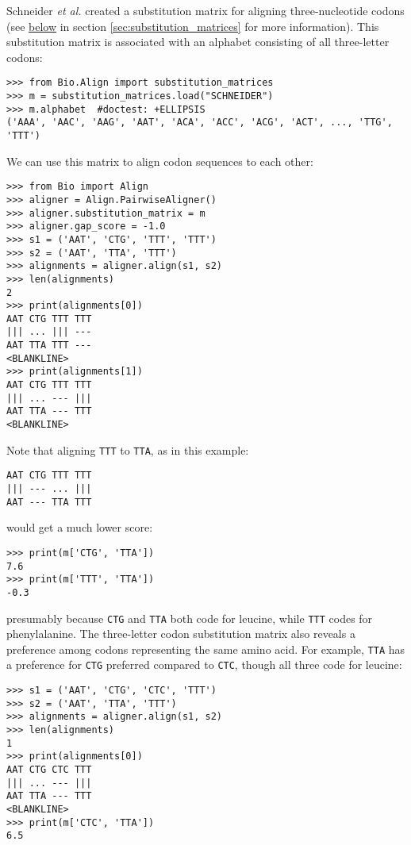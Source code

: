 Schneider \textit{et al.} \cite{schneider2005} created a substitution matrix for aligning three-nucleotide codons (see \hyperlink{codonmatrix}{below} in section \ref{sec:substitution_matrices} for more information). This substitution matrix is associated with an alphabet consisting of all three-letter codons:

\begin{verbatim}
>>> from Bio.Align import substitution_matrices
>>> m = substitution_matrices.load("SCHNEIDER")
>>> m.alphabet  #doctest: +ELLIPSIS
('AAA', 'AAC', 'AAG', 'AAT', 'ACA', 'ACC', 'ACG', 'ACT', ..., 'TTG', 'TTT')
\end{verbatim}
We can use this matrix to align codon sequences to each other:

\begin{verbatim}
>>> from Bio import Align
>>> aligner = Align.PairwiseAligner()
>>> aligner.substitution_matrix = m
>>> aligner.gap_score = -1.0
>>> s1 = ('AAT', 'CTG', 'TTT', 'TTT')
>>> s2 = ('AAT', 'TTA', 'TTT')
>>> alignments = aligner.align(s1, s2)
>>> len(alignments)
2
>>> print(alignments[0])
AAT CTG TTT TTT
||| ... ||| ---
AAT TTA TTT ---
<BLANKLINE>
>>> print(alignments[1])
AAT CTG TTT TTT
||| ... --- |||
AAT TTA --- TTT
<BLANKLINE>
\end{verbatim}
Note that aligning \verb+TTT+ to \verb+TTA+, as in this example:
\begin{verbatim}
AAT CTG TTT TTT
||| --- ... |||
AAT --- TTA TTT
\end{verbatim}
would get a much lower score:

\begin{verbatim}
>>> print(m['CTG', 'TTA'])
7.6
>>> print(m['TTT', 'TTA'])
-0.3
\end{verbatim}
presumably because \verb+CTG+ and \verb+TTA+ both code for leucine, while \verb+TTT+ codes for phenylalanine. The three-letter codon substitution matrix also reveals a preference among codons representing the same amino acid. For example, \verb+TTA+ has a preference for \verb+CTG+ preferred compared to \verb+CTC+, though all three code for leucine:

\begin{verbatim}
>>> s1 = ('AAT', 'CTG', 'CTC', 'TTT')
>>> s2 = ('AAT', 'TTA', 'TTT')
>>> alignments = aligner.align(s1, s2)
>>> len(alignments)
1
>>> print(alignments[0])
AAT CTG CTC TTT
||| ... --- |||
AAT TTA --- TTT
<BLANKLINE>
>>> print(m['CTC', 'TTA'])
6.5
\end{verbatim}

